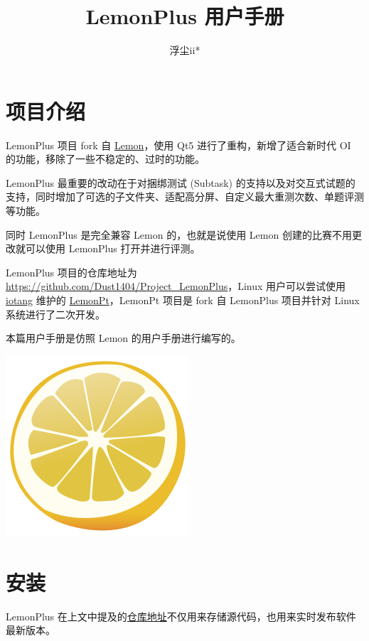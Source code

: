 \documentclass[12pt, a4paper]{article}
\title{LemonPlus 用户手册}
\author{浮尘ii*}
\date{}
\begin{document}
\maketitle
\tableofcontents

\newpage

\section{项目介绍}
LemonPlus 项目 fork 自 \href{https://github.com/zhipeng-jia/project-lemon}{Lemon}，使用 Qt5 进行了重构，新增了适合新时代 OI 的功能，移除了一些不稳定的、过时的功能。

LemonPlus 最重要的改动在于对捆绑测试 (Subtask) 的支持以及对交互式试题的支持，同时增加了可选的子文件夹、适配高分屏、自定义最大重测次数、单题评测等功能。

同时 LemonPlus 是完全兼容 Lemon 的，也就是说使用 Lemon 创建的比赛不用更改就可以使用 LemonPlus 打开并进行评测。

LemonPlus 项目的仓库地址为 \url{https://github.com/Dust1404/Project_LemonPlus}，Linux 用户可以尝试使用 \href{https://github.com/iotang}{iotang} 维护的 \href{https://github.com/iotang/Project_LemonPt}{LemonPt}，LemonPt 项目是 fork 自 LemonPlus 项目并针对 Linux 系统进行了二次开发。

本篇用户手册是仿照 Lemon 的用户手册进行编写的。

\begin{center}
\includegraphics{pic/icon.png}
\end{center}

\newpage

\section{安装}

LemonPlus 在上文中提及的\href{https://github.com/Dust1404/Project_LemonPlus}{仓库地址}不仅用来存储源代码，也用来实时发布软件最新版本。
\end{document}
